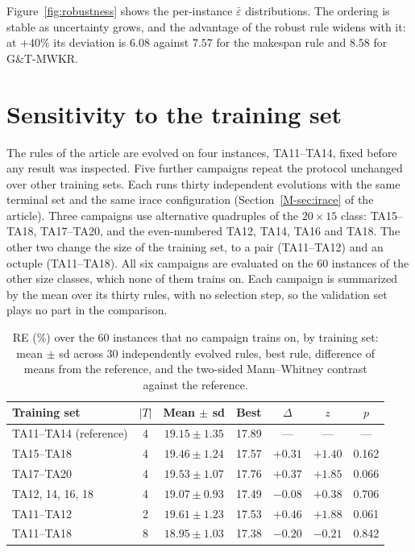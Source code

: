 \documentclass[11pt]{article}
\begin{document}
Figure~\ref{fig:robustness} shows the per-instance $\bar\varepsilon$
distributions. The ordering is stable as uncertainty grows, and the
advantage of the robust rule widens with it: at $+40\%$ its deviation is
$6.08$ against $7.57$ for the makespan rule and $8.58$ for G\&T-MWKR.

\section{Sensitivity to the training set}
\label{sec:trainset}

The rules of the article are evolved on four instances, TA11--TA14,
fixed before any result was inspected. Five further campaigns repeat
the protocol unchanged over other training sets. Each runs thirty
independent evolutions with the same terminal set and the same irace
configuration (Section~\ref{M-sec:irace} of the article). Three
campaigns use alternative quadruples of the $20{\times}15$ class:
TA15--TA18, TA17--TA20, and the even-numbered TA12, TA14, TA16 and
TA18. The other two change the size of the training set, to a pair
(TA11--TA12) and an octuple (TA11--TA18). All six campaigns are
evaluated on the 60 instances of the other size classes, which none of
them trains on. Each campaign is summarized by the mean over its thirty
rules, with no selection step, so the validation set plays no part in
the comparison.

\begin{table}[!htb]
\centering\small
\caption{RE (\%) over the 60 instances that no campaign trains on, by
training set: mean $\pm$ sd across 30 independently evolved rules, best
rule, difference of means from the reference, and the two-sided
Mann--Whitney contrast against the reference.}
\label{tab:trainset}
\begin{tabular}{lcccccc}
\toprule
Training set & $|T|$ & Mean $\pm$ sd & Best & $\Delta$ & $z$ & $p$ \\
\midrule
TA11--TA14 (reference) & 4 & $19.15 \pm 1.35$ & 17.89 & --- & --- & --- \\
TA15--TA18 & 4 & $19.46 \pm 1.24$ & 17.57 & $+0.31$ & $+1.40$ & 0.162 \\
TA17--TA20 & 4 & $19.53 \pm 1.07$ & 17.76 & $+0.37$ & $+1.85$ & 0.066 \\
TA12, 14, 16, 18 & 4 & $19.07 \pm 0.93$ & 17.49 & $-0.08$ & $+0.38$ & 0.706 \\
TA11--TA12 & 2 & $19.61 \pm 1.23$ & 17.53 & $+0.46$ & $+1.88$ & 0.061 \\
TA11--TA18 & 8 & $18.95 \pm 1.03$ & 17.38 & $-0.20$ & $-0.21$ & 0.842 \\
\bottomrule
\end{tabular}
\end{table}
\end{document}
